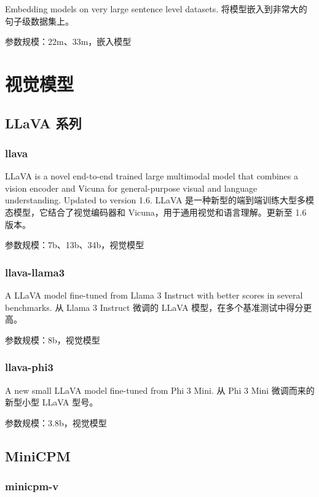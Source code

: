 \documentclass[12pt,UTF8]{ctexbook}
\begin{document}
Embedding models on very large sentence level datasets.
将模型嵌入到非常大的句子级数据集上。

参数规模：22m、33m，嵌入模型

\chapter{视觉模型}

\section{LLaVA 系列}

\subsection{llava}

LLaVA is a novel end-to-end trained large multimodal model that combines a vision encoder and Vicuna for general-purpose visual and language understanding. Updated to version 1.6.
LLaVA 是一种新型的端到端训练大型多模态模型，它结合了视觉编码器和 Vicuna，用于通用视觉和语言理解。更新至 1.6 版本。

参数规模：7b、13b、34b，视觉模型

\subsection{llava-llama3}

A LLaVA model fine-tuned from Llama 3 Instruct with better scores in several benchmarks.
从 Llama 3 Instruct 微调的 LLaVA 模型，在多个基准测试中得分更高。

参数规模：8b，视觉模型

\subsection{llava-phi3}

A new small LLaVA model fine-tuned from Phi 3 Mini.
从 Phi 3 Mini 微调而来的新型小型 LLaVA 型号。

参数规模：3.8b，视觉模型

\section{MiniCPM}

\subsection{minicpm-v}
\end{document}
